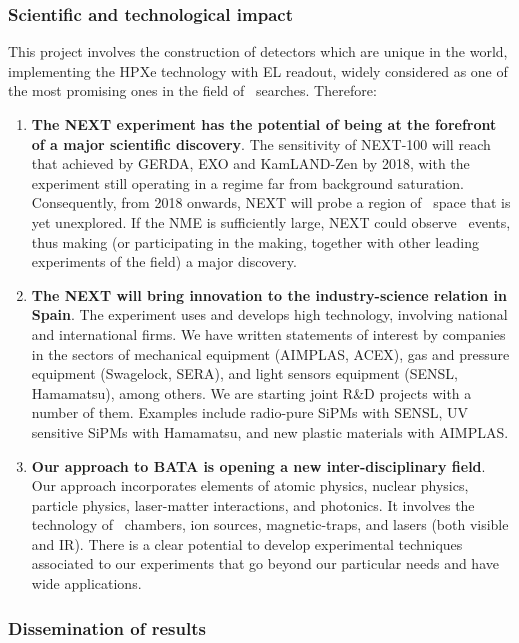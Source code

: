 \subsubsection*{Scientific and technological impact}

This project involves the construction of detectors which are unique in the world, implementing the HPXe technology with EL readout, widely considered as one of the most promising ones in the field of \bbonu\ searches. Therefore: 
\begin{enumerate}
\item {\bf The NEXT experiment has the potential of being at the forefront of a major scientific discovery}. The sensitivity of NEXT-100 will reach that achieved by GERDA, EXO and KamLAND-Zen by 2018, with the experiment still operating in a regime far from background saturation. Consequently, from 2018 onwards, NEXT will probe a region of \mbb\ space that is yet unexplored. If the NME is sufficiently large, NEXT could observe \bbonu\ events, thus making (or participating in the making, together with other leading experiments of the field) a major discovery.
\item {\bf The NEXT will bring innovation to the industry-science relation in Spain}. The experiment uses and develops high technology, involving national and international firms. We have written statements of interest by companies in the sectors of mechanical equipment (AIMPLAS, ACEX), gas and pressure equipment (Swagelock, SERA), and light sensors equipment (SENSL, Hamamatsu), among others. We are starting joint R\&D  projects with a number of them. Examples include radio-pure SiPMs with SENSL, UV sensitive SiPMs with Hamamatsu, and new plastic materials with AIMPLAS.  
\item {\bf Our approach to BATA is opening a new inter-disciplinary field}. Our approach incorporates elements of atomic physics, nuclear physics, particle physics, laser-matter interactions, and photonics. It involves the technology of \HPXE\ chambers, ion sources, magnetic-traps, and lasers (both visible and IR). There is a clear potential to develop experimental techniques associated to our experiments that go beyond our particular needs and have wide applications.
\end{enumerate}

\subsubsection*{Dissemination of results}


